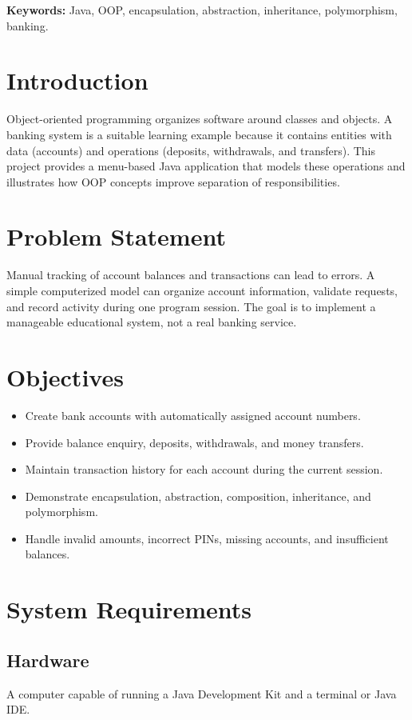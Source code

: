 \documentclass[11pt,a4paper]{report}
\begin{document}
\textbf{Keywords:} Java, OOP, encapsulation, abstraction, inheritance, polymorphism, banking.

\section{Introduction}
Object-oriented programming organizes software around classes and objects. A banking system is a suitable learning example because it contains entities with data (accounts) and operations (deposits, withdrawals, and transfers). This project provides a menu-based Java application that models these operations and illustrates how OOP concepts improve separation of responsibilities.

\section{Problem Statement}
Manual tracking of account balances and transactions can lead to errors. A simple computerized model can organize account information, validate requests, and record activity during one program session. The goal is to implement a manageable educational system, not a real banking service.

\section{Objectives}
\begin{itemize}
\item Create bank accounts with automatically assigned account numbers.
\item Provide balance enquiry, deposits, withdrawals, and money transfers.
\item Maintain transaction history for each account during the current session.
\item Demonstrate encapsulation, abstraction, composition, inheritance, and polymorphism.
\item Handle invalid amounts, incorrect PINs, missing accounts, and insufficient balances.
\end{itemize}

\section{System Requirements}
\subsection{Hardware}
A computer capable of running a Java Development Kit and a terminal or Java IDE.
\end{document}
